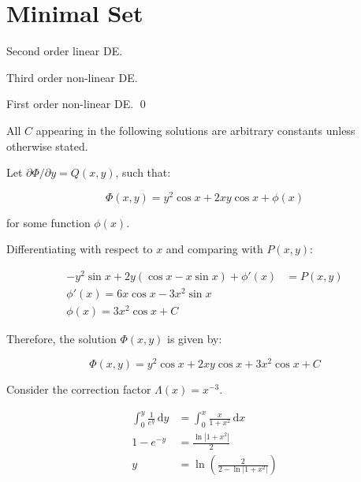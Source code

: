 \documentclass[12pt]{article}
\begin{document}



\pagebreak
\section*{Minimal Set}



Second order linear DE.

Third order non-linear DE.

First order non-linear DE.
\qed


All $C$ appearing in the following solutions are arbitrary constants unless otherwise stated.

Let $\partial \Phi/\partial y = Q(x, y)$, such that:

\begin{equation}
    \Phi(x, y) = y^{2} \cos{x} + 2xy \cos{x} + \phi(x)
\end{equation}

for some function $\phi(x)$.

Differentiating with respect to $x$ and comparing with $P(x, y)$:

\begin{equation}
    \begin{split}
        -y^{2} \sin{x} + 2y (\cos{x} - x \sin{x}) + \phi'(x) &= P(x, y) \\
        \phi'(x) = 6x \cos{x} - 3x^{2} \sin{x} \\
        \phi(x) = 3x^{2} \cos{x} + C
    \end{split}
\end{equation}

Therefore, the solution $\Phi(x, y)$ is given by:

\begin{equation}
    \Phi(x, y) = y^{2} \cos{x} + 2xy \cos{x} + 3x^{2} \cos{x} + C
\end{equation}


\begin{correction}
    Consider the correction factor $\Lambda(x) = x^{-3}$.
\end{correction}



\begin{equation}
    \begin{split}
        \int_{0}^{y} \frac{1}{e^{y}} \, \mathrm{d}y &= \int_{0}^{x} \frac{x}{1 + x^{2}} \, \mathrm{d}x \\
        1 - e^{-y} &= \frac{\ln{\left\lvert 1 + x^{2} \right\rvert}}{2} \\
        y &= \ln{\left( \frac{2}{2 - \ln{\left\lvert 1 + x^{2} \right\rvert}} \right)}
    \end{split}
\end{equation}
\end{document}
